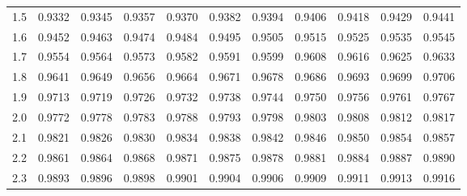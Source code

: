 \begin{table}[p]
\begin{center}
{\begin{tabular}{c | rrrrr | rrrrr |}
  \hline
  1.5 & \footnotesize{0.9332} & \footnotesize{0.9345} & \footnotesize{0.9357} & \footnotesize{0.9370} & \footnotesize{0.9382} & \footnotesize{0.9394} & \footnotesize{0.9406} & \footnotesize{0.9418} & \footnotesize{0.9429} & \footnotesize{0.9441} \\
  1.6 & \footnotesize{0.9452} & \footnotesize{0.9463} & \footnotesize{0.9474} & \footnotesize{0.9484} & \footnotesize{0.9495} & \footnotesize{0.9505} & \footnotesize{0.9515} & \footnotesize{0.9525} & \footnotesize{0.9535} & \footnotesize{0.9545} \\
  1.7 & \footnotesize{0.9554} & \footnotesize{0.9564} & \footnotesize{0.9573} & \footnotesize{0.9582} & \footnotesize{0.9591} & \footnotesize{0.9599} & \footnotesize{0.9608} & \footnotesize{0.9616} & \footnotesize{0.9625} & \footnotesize{0.9633} \\
  1.8 & \footnotesize{0.9641} & \footnotesize{0.9649} & \footnotesize{0.9656} & \footnotesize{0.9664} & \footnotesize{0.9671} & \footnotesize{0.9678} & \footnotesize{0.9686} & \footnotesize{0.9693} & \footnotesize{0.9699} & \footnotesize{0.9706} \\
  1.9 & \footnotesize{0.9713} & \footnotesize{0.9719} & \footnotesize{0.9726} & \footnotesize{0.9732} & \footnotesize{0.9738} & \footnotesize{0.9744} & \footnotesize{0.9750} & \footnotesize{0.9756} & \footnotesize{0.9761} & \footnotesize{0.9767} \\
  \hline
  \hline
  2.0 & \footnotesize{0.9772} & \footnotesize{0.9778} & \footnotesize{0.9783} & \footnotesize{0.9788} & \footnotesize{0.9793} & \footnotesize{0.9798} & \footnotesize{0.9803} & \footnotesize{0.9808} & \footnotesize{0.9812} & \footnotesize{0.9817} \\
  2.1 & \footnotesize{0.9821} & \footnotesize{0.9826} & \footnotesize{0.9830} & \footnotesize{0.9834} & \footnotesize{0.9838} & \footnotesize{0.9842} & \footnotesize{0.9846} & \footnotesize{0.9850} & \footnotesize{0.9854} & \footnotesize{0.9857} \\
  2.2 & \footnotesize{0.9861} & \footnotesize{0.9864} & \footnotesize{0.9868} & \footnotesize{0.9871} & \footnotesize{0.9875} & \footnotesize{0.9878} & \footnotesize{0.9881} & \footnotesize{0.9884} & \footnotesize{0.9887} & \footnotesize{0.9890} \\
  2.3 & \footnotesize{0.9893} & \footnotesize{0.9896} & \footnotesize{0.9898} & \footnotesize{0.9901} & \footnotesize{0.9904} & \footnotesize{0.9906} & \footnotesize{0.9909} & \footnotesize{0.9911} & \footnotesize{0.9913} & \footnotesize{0.9916} \\

\end{tabular}}
\end{center}
\end{table}
